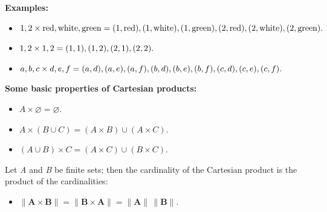 \textbf{Examples:}



\begin{itemize}
    \item $\\{1, 2\\} \times \\{\text{red}, \text{white}, \text{green}\\} = \\{(1, \text{red}), (1, \text{white}), (1, \text{green}), (2, \text{red}), (2, \text{white}), (2, \text{green})\\}.$
    \item $\\{1, 2\\} \times \\{1, 2\\} = \\{(1, 1), (1, 2), (2, 1), (2, 2)\\}.$
    \item $\\{a, b, c\\} \times \\{d, e, f\\} = \\{(a, d), (a, e), (a, f), (b, d), (b, e), (b, f), (c, d), (c, e), (c, f)\\}.$
\end{itemize}

\textbf{Some basic properties of Cartesian products:}



\begin{itemize}
    \item $A \times \varnothing = \varnothing.$
    \item $A \times (B \cup C) = (A \times B) \cup (A \times C).$
    \item $(A \cup B) \times C = (A \times C) \cup (B \times C).$
\end{itemize}

Let \textit{A} and \textit{B} be finite sets; then the cardinality of the Cartesian
product is the product of the cardinalities:



\begin{itemize}
    \item \(\| \mathbf{A} \times \mathbf{B} \| = \| \mathbf{B} \times \mathbf{A} \| = \| \mathbf{A} \| \, \| \mathbf{B} \|\).
\end{itemize}


